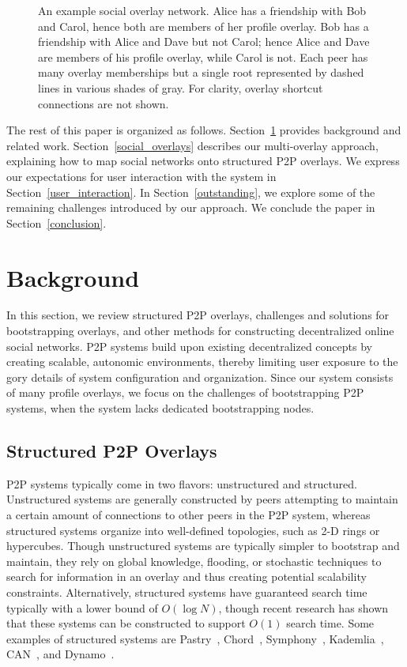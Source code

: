 \documentclass[conference]{IEEEtran}
\begin{document}
\begin{figure}[h]
\centering
{}
\caption{An example social overlay network.  Alice has a friendship with Bob
and Carol, hence both are members of her profile overlay. Bob has a friendship
with Alice and Dave but not Carol; hence Alice and Dave are members of his
profile overlay, while Carol is not.  Each peer has many overlay memberships
but a single root represented by dashed lines in various shades of gray.  For
clarity, overlay shortcut connections are not shown.} \label{fig:system}
\end{figure}

The rest of this paper is organized as follows.  Section~\ref{background}
provides background and related work.  Section~\ref{social_overlays} describes
our multi-overlay approach, explaining how to map social networks onto
structured P2P overlays.  We express our expectations for user interaction with
the system in Section~\ref{user_interaction}.  In Section~\ref{outstanding}, we
explore some of the remaining challenges introduced by our approach.  We
conclude the paper in Section~\ref{conclusion}.

\section{Background}
\label{background}

In this section, we review structured P2P overlays, challenges and solutions
for bootstrapping overlays, and other methods for constructing decentralized
online social networks.  P2P systems build upon existing decentralized concepts
by creating scalable, autonomic environments, thereby limiting user exposure to
the gory details of system configuration and organization.  Since our system
consists of many profile overlays, we focus on the challenges of bootstrapping
P2P systems, when the system lacks dedicated bootstrapping nodes.

\subsection{Structured P2P Overlays}

P2P systems typically come in two flavors:  unstructured and structured.
Unstructured systems are generally constructed by peers attempting to maintain
a certain amount of connections to other peers in the P2P system, whereas
structured systems organize into well-defined topologies, such as 2-D rings or
hypercubes.  Though unstructured systems are typically simpler to bootstrap and
maintain, they rely on global knowledge, flooding, or stochastic techniques to
search for information in an overlay and thus creating potential scalability
constraints.  Alternatively, structured systems have guaranteed search time
typically with a lower bound of $O(\log N)$, though recent research has shown
that these systems can be constructed to support $O(1)$ search time.  Some
examples of structured systems are Pastry~\cite{pastry}, Chord~\cite{chord},
Symphony~\cite{symphony}, Kademlia~\cite{kademlia}, CAN~\cite{can}, and
Dynamo~\cite{dynamo}.
\end{document}
